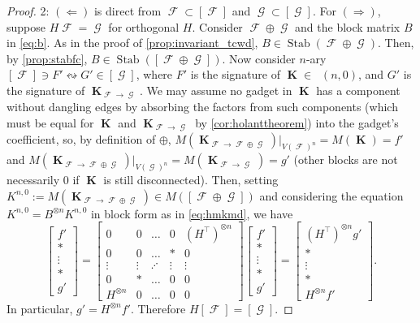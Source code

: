 \documentclass{theoretics}
\DeclareMathOperator{\vk}{\mathbf{K}}
\DeclareMathOperator{\fc}{\mathcal{F}}
\DeclareMathOperator{\gc}{\mathcal{G}}
\DeclareMathOperator{\qk}{\mathfrak{Q}_{\mathcal{F}}}
\DeclareMathOperator{\stab}{Stab}
\begin{document}
\begin{proof}
    2: $(\Longleftarrow)$ is direct from $\fc \subset [\fc]$ and $\gc \subset [\gc]$. For $(\Longrightarrow)$, suppose
    $H\fc = \gc$ for orthogonal $H$. Consider $\fc \oplus \gc$ and the block matrix 
    $B$ in \eqref{eq:b}. As in the proof of \autoref{prop:invariant_tcwd},
    $B \in \stab(\fc \oplus \gc)$. Then, by \autoref{prop:stabfc}, $B \in 
    \stab([\fc \oplus \gc])$. Now consider $n$-ary 
    $[\fc] \ni F' \leftrightsquigarrow G' \in [\gc]$,
    where $F'$ is the signature of $\vk \in \qk(n,0)$, and $G'$ is the signature of $\vk_{\fc\to\gc}$.
    We may assume no gadget in $\vk$ has a component without dangling edges
    by absorbing the factors from such components (which must be equal for
    $\vk$ and $\vk_{\fc\to\gc}$ by \autoref{cor:holanttheorem}) into the gadget's coefficient,
    so, by definition of $\oplus$, $M(\vk_{\fc\to\fc\oplus\gc})|_{V(\fc)^n} = M(\vk) = f'$ and
    $M(\vk_{\fc\to\fc\oplus\gc})|_{V(\gc)^n} = M(\vk_{\fc\to\gc}) = g'$ (other blocks are not necessarily
    0 if $\vk$ is still disconnected). Then, setting
    $K^{n,0} := M(\vk_{\fc\to\fc\oplus\gc}) \in M([\fc \oplus \gc])$ and considering 
    the equation $K^{n,0} = B^{\otimes n}K^{n,0}$ in block form as in \eqref{eq:hmkmd}, we have
    \[
        \begin{bmatrix} 
            f' \\ * \\ \vdots \\ * \\ g'
        \end{bmatrix} =
        \begin{bmatrix} 
            0 & 0 & \ldots & 0 &(H^\top)^{\otimes n}\\
            0 & 0 & \ldots & * & 0\\
            \vdots & \vdots & \iddots & \vdots & \vdots \\
            0 & * & \ldots & 0 & 0\\
            H^{\otimes n} & 0 & \ldots & 0 & 0
        \end{bmatrix}
        \begin{bmatrix} 
            f' \\ * \\ \vdots \\ * \\ g'
        \end{bmatrix}
        =
        \begin{bmatrix} 
            (H^\top)^{\otimes n} g' \\ * \\ \vdots \\ * \\ H^{\otimes n} f'
        \end{bmatrix}.
    \]
    In particular, $g' = H^{\otimes n}f'$. Therefore $H[\fc] = [\gc]$.
\end{proof}
\end{document}
